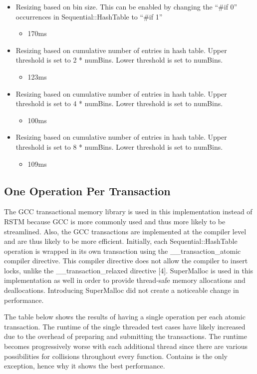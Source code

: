 \documentclass[11pt]{article} %
\begin{document}
\begin{itemize}
	\item Resizing based on bin size. This can be enabled by changing the “\#if 0” occurrences in Sequential::HashTable to “\#if 1”
	\begin{itemize}
    		\item 170ms
	\end{itemize}
	\item Resizing based on cumulative number of entries in hash table. Upper threshold is set to 2 * numBins. Lower threshold is set to numBins.
	\begin{itemize}
		\item 123ms
	\end{itemize}
	\item Resizing based on cumulative number of entries in hash table. Upper threshold is set to 4 * numBins. Lower threshold is set to numBins.
	\begin{itemize}
		\item 100ms
	\end{itemize}
	\item Resizing based on cumulative number of entries in hash table. Upper threshold is set to 8 * numBins. Lower threshold is set to numBins.
	\begin{itemize}
		\item 109ms
	\end{itemize}
\end{itemize}

\subsection{One Operation Per Transaction}

The GCC transactional memory library is used in this implementation instead of RSTM because GCC is more commonly used and thus more likely to be streamlined. Also, the GCC transactions are implemented at the compiler level and are thus likely to be more efficient. Initially, each Sequential::HashTable operation is wrapped in its own transaction using the \_\_transaction\_atomic compiler directive. This compiler directive does not allow the compiler to insert locks, unlike the \_\_transaction\_relaxed directive [4]. SuperMalloc is used in this implementation as well in order to provide thread-safe memory allocations and deallocations. Introducing SuperMalloc did not create a noticeable change in performance.

The table below shows the results of having a single operation per each atomic transaction. The runtime of the single threaded test cases have likely increased due to the overhead of preparing and submitting the transactions. The runtime becomes progressively worse with each additional thread since there are various possibilities for collisions throughout every function. Contains is the only exception, hence why it shows the best performance.
\end{document}

